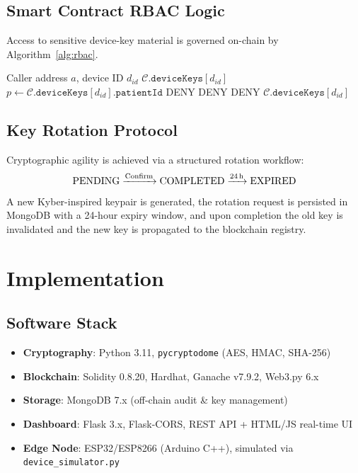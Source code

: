 \documentclass[conference]{IEEEtran}
\begin{document}
\subsection{Smart Contract RBAC Logic}
\label{sec:rbac}

Access to sensitive device-key material is governed on-chain by Algorithm~\ref{alg:rbac}.

\begin{algorithm}[!t]
\caption{On-Chain RBAC: \texttt{getDeviceKey}}\label{alg:rbac}
\begin{algorithmic}[1]
\REQUIRE Caller address $a$, device ID $d_{\mathit{id}}$
  \RETURN $\mathcal{C}.\mathtt{deviceKeys}[d_{\mathit{id}}]$
\ENDIF
\STATE $p \leftarrow \mathcal{C}.\mathtt{deviceKeys}[d_{\mathit{id}}].\mathtt{patientId}$
 \RETURN DENY \ENDIF
{} \RETURN DENY \ENDIF
{} \RETURN DENY \ENDIF
\RETURN $\mathcal{C}.\mathtt{deviceKeys}[d_{\mathit{id}}]$
\end{algorithmic}
\end{algorithm}

\subsection{Key Rotation Protocol}
Cryptographic agility is achieved via a structured rotation workflow:
\[\text{PENDING} \xrightarrow{\text{Confirm}} \text{COMPLETED} \xrightarrow{\text{24\,h}} \text{EXPIRED}\]
A new Kyber-inspired keypair is generated, the rotation request is persisted in MongoDB
with a 24-hour expiry window, and upon completion the old key is invalidated and the
new key is propagated to the blockchain registry.

\section{Implementation}
\label{sec:implementation}

\subsection{Software Stack}
\begin{itemize}
  \item \textbf{Cryptography}: Python 3.11, \texttt{pycryptodome} (AES, HMAC, SHA-256)
  \item \textbf{Blockchain}: Solidity 0.8.20, Hardhat, Ganache v7.9.2, Web3.py 6.x
  \item \textbf{Storage}: MongoDB 7.x (off-chain audit \& key management)
  \item \textbf{Dashboard}: Flask 3.x, Flask-CORS, REST API + HTML/JS real-time UI
  \item \textbf{Edge Node}: ESP32/ESP8266 (Arduino C++), simulated via
        \texttt{device\_simulator.py}
\end{itemize}
\end{document}
